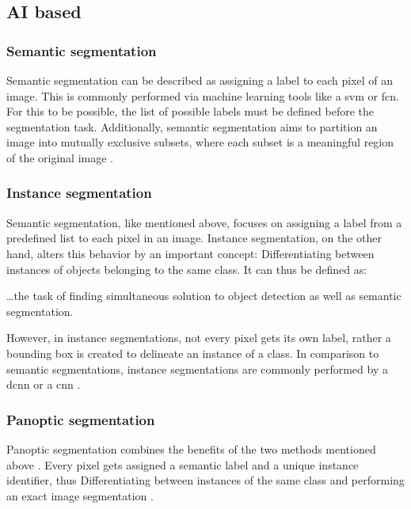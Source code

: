 \subsection{AI based}\label{s:b-seg-ai}

\subsubsection{Semantic segmentation}
Semantic segmentation can be described as assigning a label to each pixel of an image.
This is commonly performed via machine learning tools like a \acrfull{svm} or \acrfull{fcn}.
For this to be possible, the list of possible labels must be defined before the segmentation task.
Additionally, semantic segmentation aims to partition an image into mutually exclusive subsets,
where each subset is a meaningful region of the original image \cite{haoBriefSurveySemantic2020,longFullyConvolutionalNetworks2015}.

\subsubsection{Instance segmentation}
Semantic segmentation, like mentioned above, focuses on assigning a label from a predefined list to each pixel in an image.
Instance segmentation, on the other hand, alters this behavior by an important concept:
Differentiating between instances of objects belonging to the same class.
It can thus be defined as:
\begin{displayquote}
	\ldots\space the task of finding simultaneous solution to object detection as well as semantic segmentation.
\end{displayquote}
However, in instance segmentations, not every pixel gets its own label, rather a bounding box is created to delineate an instance of a class.
In comparison to semantic segmentations, instance segmentations are commonly performed by a \acrfull{dcnn} or a \acrfull{cnn} \cite{hafizSurveyInstanceSegmentation2020,chenMaskLabInstanceSegmentation2018}.

\subsubsection{Panoptic segmentation}
Panoptic segmentation combines the benefits of the two methods mentioned above
\cite{kirillovPanopticSegmentation2019}.
Every pixel gets assigned a semantic label and a unique instance identifier,
thus Differentiating between instances of the same class and performing an exact image segmentation
\cite{kirillovPanopticSegmentation2019}.

